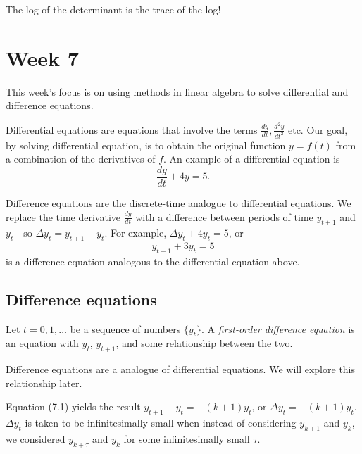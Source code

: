 \documentclass[a4paper, 12pt,oneside,openany]{book}
\begin{document}
The log of the determinant is the trace of the log!

\chapter{Week 7}

This week's focus is on using methods in linear algebra to solve differential and difference equations.

Differential equations are equations that involve the terms $\frac{dy}{dt}, \frac{d^2y}{dt^2}$ etc. Our goal, by solving differential equation, is to obtain the original function $y=f(t)$ from a combination of the derivatives of $f$. An example of a differential equation is $$\frac{dy}{dt}+4y = 5.$$

Difference equations are the discrete-time analogue to differential equations. We replace the time derivative $\frac{dy}{dt}$ with a difference between periods of time $y_{t+1}$ and $y_t$ - so $\Delta y_t = y_{t+1}-y_t$. For example, $\Delta y_t + 4y_t = 5$, or $$y_{t+1} + 3y_t = 5$$ is a difference equation analogous to the differential equation above.

\section{Difference equations}

Let $t = 0, 1, \dots$ be a sequence of numbers $\{y_t \}$. A \emph{first-order difference equation} is an equation with $y_t$, $y_{t+1}$, and some relationship between the two.

 Difference equations are a  analogue of differential equations. We will explore this relationship later.


Equation (7.1) yields the result $y_{t+1}-y_t=-(k+1)y_t$, or $\Delta y_t = -(k+1)y_t$. $\Delta y_t$ is taken to be infinitesimally small when instead of considering $y_{k+1}$ and $y_k$, we considered $y_{k+\tau}$ and $y_k$ for some infinitesimally small $\tau$.

\end{document}
